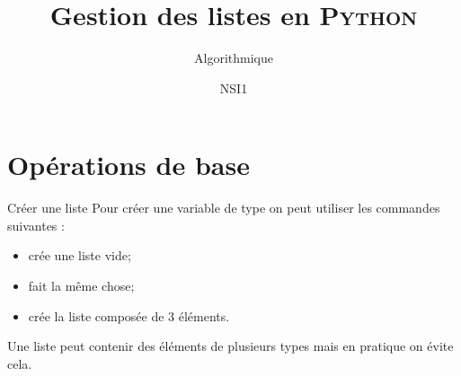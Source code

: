 \documentclass[10pt]{beamer}
\title{Gestion des listes en \textsc{Python}}
\subtitle{Algorithmique}
\author{NSI1}
\begin{document}
\maketitle
\section{Opérations de base}

\begin{frame}[fragile]{Créer une liste}\pause
Pour créer une variable de type  on peut utiliser les commandes suivantes :\pause
\begin{itemize}
\item {} crée une liste vide;\pause
\item {} fait la même chose;\pause
\item   {} crée la liste composée de 3 éléments.\pause
\end{itemize}
Une liste peut contenir des éléments de plusieurs types mais en pratique on évite cela.
\end{frame}
\end{document}
